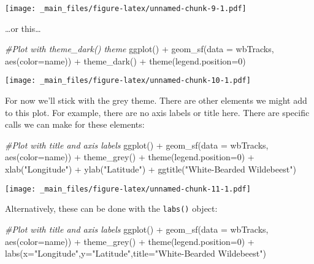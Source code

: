 \documentclass[
]{book}
\newenvironment{Shaded}{\begin{snugshade}}{\end{snugshade}}
\newcommand{\AttributeTok}[1]{\textcolor[rgb]{0.77,0.63,0.00}{#1}}
\newcommand{\CommentTok}[1]{\textcolor[rgb]{0.56,0.35,0.01}{\textit{#1}}}
\newcommand{\DecValTok}[1]{\textcolor[rgb]{0.00,0.00,0.81}{#1}}
\newcommand{\FunctionTok}[1]{\textcolor[rgb]{0.00,0.00,0.00}{#1}}
\newcommand{\NormalTok}[1]{#1}
\newcommand{\SpecialCharTok}[1]{\textcolor[rgb]{0.00,0.00,0.00}{#1}}
\newcommand{\StringTok}[1]{\textcolor[rgb]{0.31,0.60,0.02}{#1}}
\begin{document}
\texttt{[image: \_main\_files/figure-latex/unnamed-chunk-9-1.pdf]}

\ldots or this\ldots{}

\begin{Shaded}
\begin{Highlighting}[]
\CommentTok{\#Plot with theme\_dark() theme}
\FunctionTok{ggplot}\NormalTok{() }\SpecialCharTok{+} 
  \FunctionTok{geom\_sf}\NormalTok{(}\AttributeTok{data =}\NormalTok{ wbTracks, }\FunctionTok{aes}\NormalTok{(}\AttributeTok{color=}\NormalTok{name)) }\SpecialCharTok{+}
  \FunctionTok{theme\_dark}\NormalTok{() }\SpecialCharTok{+}
  \FunctionTok{theme}\NormalTok{(}\AttributeTok{legend.position=}\DecValTok{0}\NormalTok{)}
\end{Highlighting}
\end{Shaded}

\texttt{[image: \_main\_files/figure-latex/unnamed-chunk-10-1.pdf]}

For now we'll stick with the grey theme. There are other elements we might add to this plot. For example, there are no axis labels or title here. There are specific calls we can make for these elements:

\begin{Shaded}
\begin{Highlighting}[]
\CommentTok{\#Plot with title and axis labels}
\FunctionTok{ggplot}\NormalTok{() }\SpecialCharTok{+} 
  \FunctionTok{geom\_sf}\NormalTok{(}\AttributeTok{data =}\NormalTok{ wbTracks, }\FunctionTok{aes}\NormalTok{(}\AttributeTok{color=}\NormalTok{name)) }\SpecialCharTok{+}
  \FunctionTok{theme\_grey}\NormalTok{() }\SpecialCharTok{+}
  \FunctionTok{theme}\NormalTok{(}\AttributeTok{legend.position=}\DecValTok{0}\NormalTok{) }\SpecialCharTok{+}
  \FunctionTok{xlab}\NormalTok{(}\StringTok{"Longitude"}\NormalTok{) }\SpecialCharTok{+}
  \FunctionTok{ylab}\NormalTok{(}\StringTok{"Latitude"}\NormalTok{) }\SpecialCharTok{+}
  \FunctionTok{ggtitle}\NormalTok{(}\StringTok{"White{-}Bearded Wildebeest"}\NormalTok{)}
\end{Highlighting}
\end{Shaded}

\texttt{[image: \_main\_files/figure-latex/unnamed-chunk-11-1.pdf]}

Alternatively, these can be done with the \texttt{labs()} object:

\begin{Shaded}
\begin{Highlighting}[]
\CommentTok{\#Plot with title and axis labels}
\FunctionTok{ggplot}\NormalTok{() }\SpecialCharTok{+} 
  \FunctionTok{geom\_sf}\NormalTok{(}\AttributeTok{data =}\NormalTok{ wbTracks, }\FunctionTok{aes}\NormalTok{(}\AttributeTok{color=}\NormalTok{name)) }\SpecialCharTok{+}
  \FunctionTok{theme\_grey}\NormalTok{() }\SpecialCharTok{+}
  \FunctionTok{theme}\NormalTok{(}\AttributeTok{legend.position=}\DecValTok{0}\NormalTok{) }\SpecialCharTok{+}
  \FunctionTok{labs}\NormalTok{(}\AttributeTok{x=}\StringTok{"Longitude"}\NormalTok{,}\AttributeTok{y=}\StringTok{"Latitude"}\NormalTok{,}\AttributeTok{title=}\StringTok{"White{-}Bearded Wildebeest"}\NormalTok{)}
\end{Highlighting}
\end{Shaded}
\end{document}
